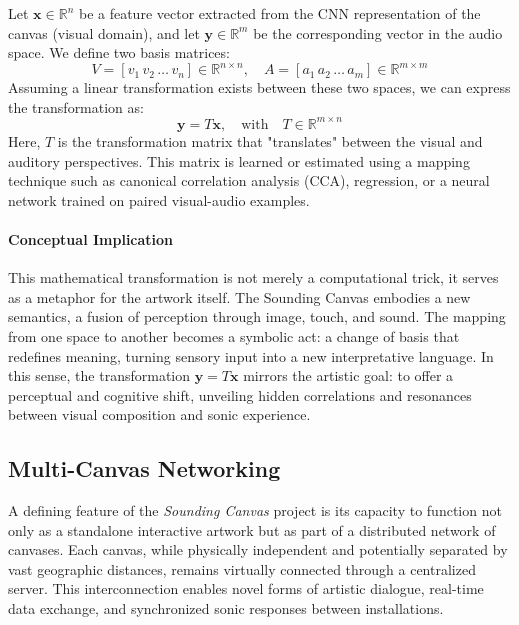 \documentclass{article}
\begin{document}
Let $\mathbf{x} \in \mathbb{R}^n$ be a feature vector extracted from the CNN representation of the canvas (visual domain), and let $\mathbf{y} \in \mathbb{R}^m$ be the corresponding vector in the audio space. \newline 
We define two basis matrices:
\[
V = [v_1 \, v_2 \, \ldots \, v_n] \in \mathbb{R}^{n \times n}, \quad A = [a_1 \, a_2 \, \ldots \, a_m] \in \mathbb{R}^{m \times m}
\]
Assuming a linear transformation exists between these two spaces, we can express the transformation as:
\[
\mathbf{y} = T \mathbf{x}, \quad \text{with} \quad T \in \mathbb{R}^{m \times n}
\]
\noindent
Here, $T$ is the transformation matrix that "translates" between the visual and auditory perspectives. This matrix is learned or estimated using a mapping technique such as canonical correlation analysis (CCA), regression, or a neural network trained on paired visual-audio examples.

\paragraph{Conceptual Implication}

This mathematical transformation is not merely a computational trick, it serves as a metaphor for the artwork itself. The Sounding Canvas embodies a new semantics, a fusion of perception through image, touch, and sound. The mapping from one space to another becomes a symbolic act: a change of basis that redefines meaning, turning sensory input into a new interpretative language. \newline
In this sense, the transformation $\mathbf{y} = T \mathbf{x}$ mirrors the artistic goal: to offer a perceptual and cognitive shift, unveiling hidden correlations and resonances between visual composition and sonic experience.

\subsection{Multi-Canvas Networking}
A defining feature of the \textit{Sounding Canvas} project is its capacity to function not only as a standalone interactive artwork but as part of a distributed network of canvases. Each canvas, while physically independent and potentially separated by vast geographic distances, remains virtually connected through a centralized server. This interconnection enables novel forms of artistic dialogue, real-time data exchange, and synchronized sonic responses between installations.
\end{document}

